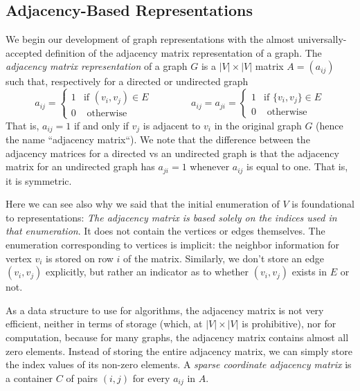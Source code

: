 


\subsection{Adjacency-Based Representations}

We begin our development of graph representations
with the almost universally-accepted definition of the
adjacency matrix representation of a graph.
%
The \emph{adjacency matrix representation} of a graph $G$ is a $|V|\times |V|$ matrix $A = (a_{ij})$ such that,
respectively for a directed or undirected graph
\[
 a_{i j} = 
 \left\{
 \begin{array}{rl}
  1 & \textrm{if } (v_i, v_j) \in E \\
  0 & \textrm { otherwise }
 \end{array}
 \right.
 \qquad\qquad
 a_{i j} = a_{ji} =
 \left\{
 \begin{array}{rl}
  1 & \textrm{if } \{v_i, v_j\} \in E \\ 
  0 & \textrm { otherwise }
 \end{array}
 \right.
\]
That is, $a_{ij} = 1$ if and only if $v_j$ is adjacent to $v_i$ in the original graph $G$ (hence the name ``adjacency matrix``).  We note that the difference between the adjacency matrices for a directed vs an undirected graph is that the adjacency matrix for an undirected graph has $a_{ji} = 1$ whenever $a_{ij}$ is equal to one.  That is, it is symmetric.

Here we can see also why we said that the initial enumeration of $V$ is foundational to representations:  \emph{The adjacency matrix is based solely on the indices used in that enumeration}.  It does not contain the vertices or edges themselves.  The enumeration corresponding to vertices is implicit: the neighbor information for vertex $v_i$ is stored on row $i$ of the matrix.  Similarly, we don't store an edge $(v_i, v_j)$ explicitly, but rather an indicator as to whether $(v_i, v_j)$ exists in $E$ or not.


As a data structure to use for algorithms, the adjacency matrix is not very efficient, neither in terms of storage (which, at 
$|V|\times |V|$ is prohibitive), nor for computation, because for many graphs, the adjacency matrix contains almost all zero elements. Instead of storing the entire
adjacency matrix, we can simply store the index values of its non-zero elements.  A \emph{sparse coordinate adjacency
matrix} is a container $C$ of pairs $(i, j)$ for every $a_{ij}$ in $A$.

